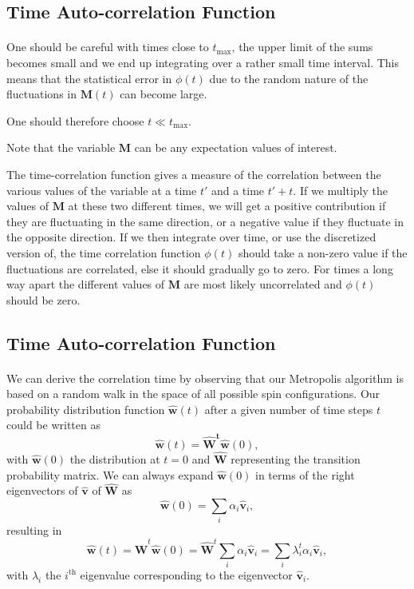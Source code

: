\documentclass[%
oneside,                 %
final,                   %
10pt]{article}
\begin{document}
\subsection*{Time Auto-correlation Function}

\paragraph{}
One should be careful with times close to $t_{\mathrm{max}}$, the upper limit of the sums 
becomes small and we end up integrating over a rather small time interval. This means that the statistical
error in $\phi(t)$ due to the random nature of the fluctuations in $\mathbf{M}(t)$ can become large.

One should therefore choose $t \ll t_{\mathrm{max}}$.

Note that the variable $\mathbf{M}$ can be any expectation values of interest.

The time-correlation function gives a measure of the correlation between the various values of the variable 
at a time $t'$ and a time $t'+t$. If we multiply the values of $\mathbf{M}$ at these two different times,
we will get a positive contribution if they are fluctuating in the same direction, or a negative value
if they fluctuate in the opposite direction. If we then integrate over time, or use the discretized version of, the time correlation function $\phi(t)$ should take a non-zero value if the fluctuations are 
correlated, else it should gradually go to zero. For times a long way apart 
the different values of $\mathbf{M}$  are most likely 
uncorrelated and $\phi(t)$ should be zero.



\subsection*{Time Auto-correlation Function}

\paragraph{}
We can derive the correlation time by observing that our Metropolis algorithm is based on a random
walk in the space of all  possible spin configurations. 
Our probability 
distribution function $\mathbf{\hat{w}}(t)$ after a given number of time steps $t$ could be written as
\[
   \mathbf{\hat{w}}(t) = \mathbf{\hat{W}^t\hat{w}}(0),
\]
with $\mathbf{\hat{w}}(0)$ the distribution at $t=0$ and $\mathbf{\hat{W}}$ representing the 
transition probability matrix. 
We can always expand $\mathbf{\hat{w}}(0)$ in terms of the right eigenvectors of 
$\mathbf{\hat{v}}$ of $\mathbf{\hat{W}}$ as 
\[
    \mathbf{\hat{w}}(0)  = \sum_i\alpha_i\mathbf{\hat{v}}_i,
\]
resulting in 
\[
   \mathbf{\hat{w}}(t) = \mathbf{\hat{W}}^t\mathbf{\hat{w}}(0)=\mathbf{\hat{W}}^t\sum_i\alpha_i\mathbf{\hat{v}}_i=
\sum_i\lambda_i^t\alpha_i\mathbf{\hat{v}}_i,
\]
with $\lambda_i$ the $i^{\mathrm{th}}$ eigenvalue corresponding to  
the eigenvector $\mathbf{\hat{v}}_i$.
\end{document}
